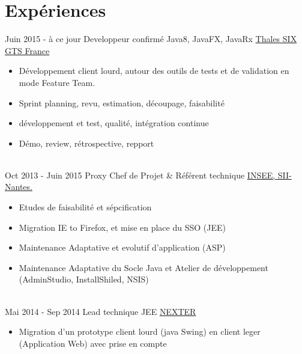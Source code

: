 \documentclass[letterpaper]{twentysecondcv} %
\begin{document}
\makeprofile %


\section{Expériences}

\begin{twenty} %
\twentyitem
    	{Juin 2015 -}
		{à ce jour}
        {Developpeur confirmé Java8, JavaFX, JavaRx}
        {\href{https://www.thalesgroup.com/fr}{Thales SIX GTS France}}
        {}
        {\begin{itemize} 		
      	\item Développement client lourd, autour des outils de tests et de validation en mode Feature Team.
        \item Sprint planning, revu, estimation, découpage, faisabilité
        \item développement et test, qualité, intégration continue
        \item Démo, review, rétrospective, repport
        \end{itemize}}
        \\
	\twentyitem
    	{Oct 2013 -}
		{Juin 2015}
        {Proxy Chef de Projet \& Référent technique}
        {\href{https://www.insee.fr/fr/accueil}{INSEE, SII-Nantes.}}
        {}
        {
        {\begin{itemize}
		\item Etudes de faisabilité et sépcification 
		\item Migration IE to Firefox, et mise en place du SSO (JEE)
		\item Maintenance Adaptative et evolutif d'application (ASP)
		\item Maintenance Adaptative du Socle Java et Atelier de développement (AdminStudio, InstallShiled, NSIS)
    \end{itemize}}
        }
    \\   
    \twentyitem
   		{Mai 2014 -}
		{Sep 2014}
        {Lead technique JEE}
        {\href{https://www.nexter-group.fr/}{NEXTER}}
        {}
        {
        {\begin{itemize}
     		\item Migration d'un prototype client lourd (java Swing) en client leger (Application Web) avec prise en compte

\end{itemize}}}
\end{twenty}
\end{document}
